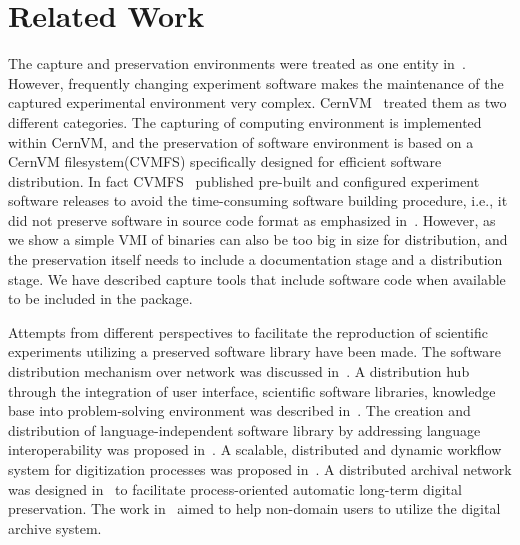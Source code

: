 \section{Related Work}

The capture and preservation environments were treated as one entity in~\cite{matthews2009towards,hong2010software}. 
However, frequently changing experiment software makes the maintenance of the captured experimental environment very complex. 
CernVM~\cite{buncic2010cernvm} treated them as two different categories. 
The capturing of computing environment is implemented within CernVM, and the preservation of software environment is based on a CernVM filesystem(CVMFS) specifically designed for efficient software distribution.
In fact CVMFS~\cite{buncic2010cernvm} published pre-built and configured experiment software releases to avoid the time-consuming software building procedure, i.e., it did not 
preserve software in source code format as emphasized in~\cite{castagne2013consider}. 
However, as we show a simple VMI of binaries can also be too big in size for distribution, and the preservation itself needs to include a documentation stage and a distribution stage. 
We have described capture tools that include software code when available to be included in the package. 

Attempts from different perspectives to facilitate the reproduction of scientific experiments utilizing a preserved software library have been made. 
The software distribution mechanism over network was discussed in~\cite{compostella2010cdf, blomer2011cernvm}.
A distribution hub through the integration of user interface, scientific software libraries, knowledge base into problem-solving environment was described in~\cite{rice1996scientific}.
The creation and distribution of language-independent software library by addressing language interoperability was proposed in~\cite{kohn2001divorcing}.
A scalable, distributed and dynamic workflow system for digitization processes was proposed in~\cite{schoneberg2013scalable}.
A distributed archival network was designed in~\cite{subotic2013distributed} to facilitate process-oriented automatic long-term digital preservation.
The work in~\cite{agosti2012envisage} aimed to help non-domain users to utilize the digital archive system.

